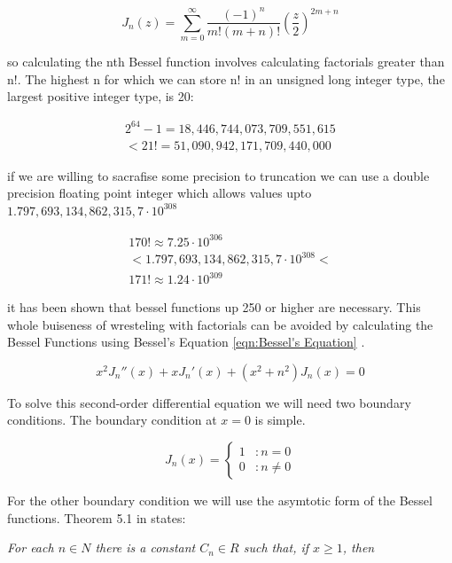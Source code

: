 \documentclass[twocolumn, groupedaddress]{revtex4-1}
\begin{document}
\begin{equation}
J_n(z) = \sum_{m=0}^{\infty} \frac{(-1)^n}{m!(m+n)!} \left( \frac{z}{2} \right)^{2m+n}
\end{equation}

so calculating the nth Bessel function involves calculating factorials greater than n!.  The highest n for which we can store n! in an unsigned long integer type, the largest positive integer type, is 20:

\begin{align}
2^{64}-1 = 18,446,744,073,709,551,615 \\
< 21! = 51,090,942,171,709,440,000
\end{align}

if we are willing to sacrafise some precision to truncation we can use a double precision floating point integer which allows values upto $1.797,693,134,862,315,7 \cdot 10^{308}$

\begin{align}
170! \approx 7.25 \cdot 10^{306}				\\
< 1.797,693,134,862,315,7 \cdot 10^{308} < 	\\
171! \approx 1.24 \cdot 10^{309}
\end{align}

it has been shown that bessel functions up 250 or higher are necessary.  This whole buiseness of wresteling with factorials can be avoided by calculating the Bessel Functions using Bessel's Equation \ref{eqn:Bessel's Equation} \citep{folland}.

\begin{equation}
\label{eqn:Bessel's Equation}
x^2 J_n''(x) + x J_n'(x) + (x^2 + n^2) J_n(x) = 0
\end{equation}

To solve this second-order differential equation we will need two boundary conditions.  The boundary condition at $x=0$ is simple.

\begin{displaymath}
   J_n(x) = \left\{
     \begin{array}{lr}
       1 & : n = 0     \\
       0 & : n \neq 0
     \end{array}
   \right.
\end{displaymath}

For the other boundary condition we will use the asymtotic form of the Bessel functions.  Theorem 5.1 in \cite{folland} states:

\textit{For each $n \in N$ there is a constant $C_n \in R$ such that, if $x \geq 1$, then}
\end{document}
